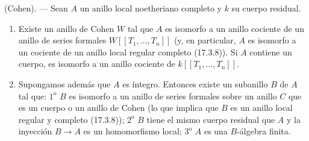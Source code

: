 \begin{theorem}[19.8.8]
\label{0.19.8.8-fr}
\textup{(Cohen).} --- Sean $A$ un anillo local noetheriano completo y $k$ su
cuerpo residual.


\begin{enumerate}
  \item[\textup{(i)}] Existe un anillo de Cohen $W$ tal que $A$ es isomorfo a un anillo
  cociente de un anillo de series formales $W[[T_1,\ldots,T_n]]$ (y, en
  particular, $A$ es isomorfo a un cociente de un anillo local regular
  completo \textup{(17.3.8)}). Si $A$ contiene un cuerpo, es isomorfo a un anillo
  cociente de $k[[T_1,\ldots,T_n]]$.
  \item[\textup{(ii)}] Supongamos además que $A$ es íntegro. Entonces existe un
  subanillo $B$ de $A$ tal que: $1^{\mathrm o}$ $B$ es isomorfo a un anillo de
  series formales sobre un anillo $C$ que es un cuerpo o un anillo de Cohen
  (lo que implica que $B$ es un anillo local regular y completo \textup{(17.3.8)});
  $2^{\mathrm o}$ $B$ tiene el mismo cuerpo residual que $A$ y la inyección
  $B\to A$ es un homomorfismo local; $3^{\mathrm o}$ $A$ es una $B$-álgebra
  finita.
\end{enumerate}
\end{theorem}

